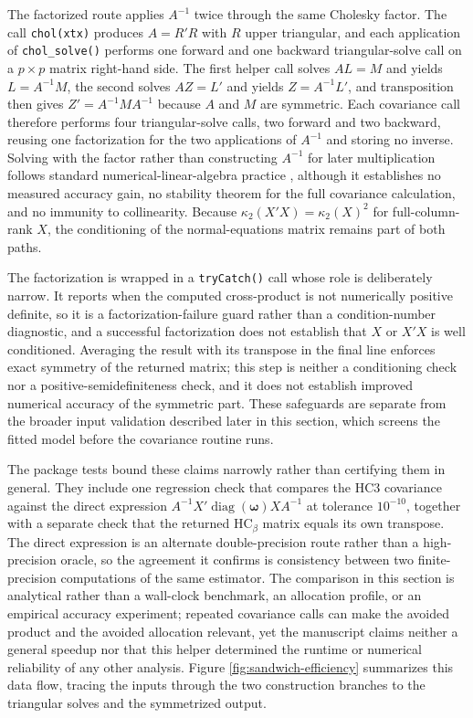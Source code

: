 The factorized route applies \(A^{-1}\) twice through the same Cholesky factor. The call \texttt{chol(xtx)} produces \(A = R'R\) with \(R\) upper triangular, and each application of \texttt{chol\_solve()} performs one forward and one backward triangular-solve call on a \(p \times p\) matrix right-hand side. The first helper call solves \(AL = M\) and yields \(L = A^{-1}M\), the second solves \(AZ = L'\) and yields \(Z = A^{-1}L'\), and transposition then gives \(Z' = A^{-1}MA^{-1}\) because \(A\) and \(M\) are symmetric. Each covariance call therefore performs four triangular-solve calls, two forward and two backward, reusing one factorization for the two applications of \(A^{-1}\) and storing no inverse. Solving with the factor rather than constructing \(A^{-1}\) for later multiplication follows standard numerical-linear-algebra practice \citep{Higham2002}, although it establishes no measured accuracy gain, no stability theorem for the full covariance calculation, and no immunity to collinearity. Because \(\kappa_2(X'X) = \kappa_2(X)^2\) for full-column-rank \(X\), the conditioning of the normal-equations matrix remains part of both paths.

The factorization is wrapped in a \texttt{tryCatch()} call whose role is deliberately narrow. It reports when the computed cross-product is not numerically positive definite, so it is a factorization-failure guard rather than a condition-number diagnostic, and a successful factorization does not establish that \(X\) or \(X'X\) is well conditioned. Averaging the result with its transpose in the final line enforces exact symmetry of the returned matrix; this step is neither a conditioning check nor a positive-semidefiniteness check, and it does not establish improved numerical accuracy of the symmetric part. These safeguards are separate from the broader input validation described later in this section, which screens the fitted model before the covariance routine runs.

The package tests bound these claims narrowly rather than certifying them in general. They include one regression check that compares the HC3 covariance against the direct expression \(A^{-1} X'\operatorname{diag}(\boldsymbol{\omega})X A^{-1}\) at tolerance \(10^{-10}\), together with a separate check that the returned \(\text{HC}_\beta\) matrix equals its own transpose. The direct expression is an alternate double-precision route rather than a high-precision oracle, so the agreement it confirms is consistency between two finite-precision computations of the same estimator. The comparison in this section is analytical rather than a wall-clock benchmark, an allocation profile, or an empirical accuracy experiment; repeated covariance calls can make the avoided product and the avoided allocation relevant, yet the manuscript claims neither a general speedup nor that this helper determined the runtime or numerical reliability of any other analysis. Figure \ref{fig:sandwich-efficiency} summarizes this data flow, tracing the inputs through the two construction branches to the triangular solves and the symmetrized output.

